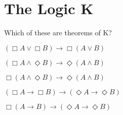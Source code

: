 \newpage

\section*{The Logic K}
Which of these are theorems of K?

\begin{enumerate*}
\setcounter{enumi}{10}
\item $(\Box A \vee \Box B) \rightarrow \Box(A \vee B)$
\item $(\Box A \wedge \Diamond B) \rightarrow \Diamond(A \wedge B)$
\item $\Box (A \wedge \Diamond B) \rightarrow \Diamond(A \wedge B)$
\item $(\Box A \rightarrow \Box B) \rightarrow (\Diamond A \rightarrow \Diamond B)$
\item $\Box (A \rightarrow B) \rightarrow (\Diamond A \rightarrow \Diamond B)$
\end{enumerate*}

